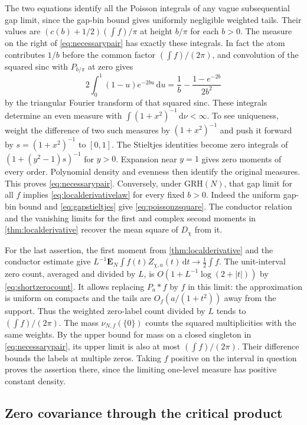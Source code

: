 \documentclass[11pt,a4paper]{article}
\numberwithin{equation}{section}
\newcommand{\grh}{\mathrm{GRH}}
\newcommand{\ud}{\mathrm d}
\begin{document}
The two equations identify all the Poisson integrals of any
vague subsequential gap limit, since the gap-bin bound gives
uniformly negligible weighted tails. Their values are
$(c(b)+1/2)(\int f)/\pi$ at height $b/\pi$ for each $b>0$.
The measure on the right of \cref{eq:necessarypair} has
exactly these integrals. In fact the atom contributes $1/b$
before the common factor $(\int f)/(2\pi)$, and convolution
of the squared sinc with $P_{b/\pi}$ at zero gives
\[
 2\int_0^1(1-u)e^{-2bu}\,\ud u
                =\frac1b-\frac{1-e^{-2b}}{2b^2}
\]
by the triangular Fourier transform of that squared sinc.
These integrals determine an even measure with
$\int(1+x^2)^{-1}\,\ud\nu<\infty$. To see uniqueness,
weight the difference of two such measures by $(1+x^2)^{-1}$
and push it forward by $s=(1+x^2)^{-1}$ to $[0,1]$.
The Stieltjes identities become zero integrals of
$(1+(y^2-1)s)^{-1}$ for $y>0$. Expansion near $y=1$
gives zero moments of every order. Polynomial density
and evenness then identify the original measures.
This proves \cref{eq:necessarypair}.
Conversely, under $\grh(N)$, that gap limit for all $f$
implies \cref{eq:localderivativelaw} for every fixed $b>0$.
Indeed the uniform gap-bin bound and \cref{eq:gapstieltjes}
give \cref{eq:poissonzsquare}. The conductor relation and
the vanishing limits for the first and complex second
moments in \cref{thm:localderivative} recover the mean
square of $D_\chi$ from it.

For the last assertion, the first moment from
\cref{thm:localderivative} and the conductor estimate give
$L^{-1}\mathbf E_N\int f(t)Z_{\chi,a}(t)\,\ud t\to \tfrac12\int f$.
The unit-interval zero count, averaged and divided by $L$,
is $O(1+L^{-1}\log(2+|t|))$ by \cref{eq:shortzerocount}.
It allows replacing $P_a*f$ by $f$ in this limit:
the approximation is uniform on compacts and the tails
are $O_f(a/(1+t^2))$ away from the support. Thus the
weighted zero-label count divided by $L$ tends to
$(\int f)/(2\pi)$. The mass $\nu_{N,f}(\{0\})$ counts
the squared multiplicities with the same weights.
By the upper bound for mass on a closed singleton
in \cref{eq:necessarypair}, its upper limit is also
at most $(\int f)/(2\pi)$. Their difference bounds
the labels at multiple zeros. Taking $f$ positive on
the interval in question proves the assertion there,
since the limiting one-level measure has positive constant
density.

\subsection{Zero covariance through the critical product}
\end{document}
